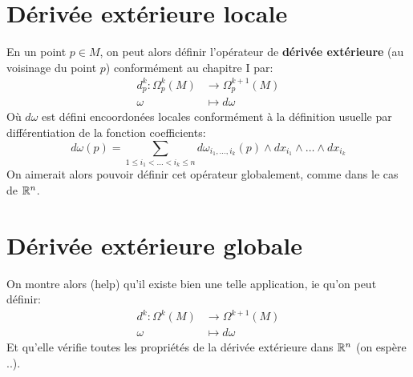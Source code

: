 \pagebreak
\section{Dérivée extérieure locale}
En un point \( p \in M \), on peut alors définir l'opérateur de \textbf{dérivée extérieure} (au voisinage du point \( p \)) conformément au chapitre I par:
\[ 
   \begin{aligned}
      d_p^k : \Omega^k_p(M) &\longrightarrow \Omega^{k+1}_p(M) \\
      \omega &\longmapsto d \omega
   \end{aligned} 
\]
Où \( d \omega \) est défini encoordonées locales conformément à la définition usuelle par différentiation de la fonction coefficients:
\[ 
   d \omega(p) = \sum_{1 \leq i_1 < \ldots < i_k \leq n} d\omega_{i_1, \ldots, i_k}(p) \wedge dx_{i_1} \wedge \ldots \wedge dx_{i_k}
\]
On aimerait alors pouvoir définir cet opérateur globalement, comme dans le cas de \( \mathbb{R}^n \).
\section{Dérivée extérieure globale}
On montre alors (help) qu'il existe bien une telle application, ie qu'on peut définir:
\[ 
   \begin{aligned}
      d^k : \Omega^k(M) &\longrightarrow \Omega^{k+1}(M) \\
      \omega &\longmapsto d \omega
   \end{aligned} 
\]
Et qu'elle vérifie toutes les propriétés de la dérivée extérieure dans \( \mathbb{R}^n \) (on espère ..).

